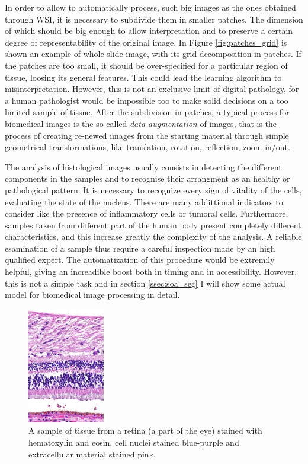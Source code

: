 In order to allow to automatically process, such big images as the ones obtained through WSI, it is necessary to subdivide them in smaller patches. The dimension of which should be big enough to allow interpretation and to preserve a certain degree of representability of the original image. In Figure \ref{fig:patches_grid} is shown an example of whole slide image, with its grid decomposition in patches. If the patches are too small, it should be over-specified for a particular region of tissue, loosing its general features. This could lead the learning algorithm to misinterpretation. However, this is not an exclusive limit of digital pathology, for a human pathologist would be impossible too to make solid decisions on a too limited sample of tissue. After the subdivision in patches, a typical process for biomedical images is the so-called \textit{data augmentation} of images, that is the process of creating re-newed images from the starting material through simple geometrical transformations, like translation, rotation, reflection, zoom in/out.

The analysis of histological images usually consists in detecting the different components in the samples and to recognise their arrangment as an healthy or pathological pattern. It is necessary to recognize every sign of vitality of the cells, evaluating the state of the nucleus. There are many addittional indicators to consider like the presence of inflammatory cells or tumoral cells. Furthermore, samples taken from different part of the human body present completely different characteristics, and this increase greatly the complexity of the analysis.
A reliable esamination of a sample thus require a careful inspection made by an high qualified expert. The automatization of this procedure would be extremily helpful, giving an increadible boost both in timing and in accessibility. However, this is not a simple task and in section \ref{ssec:soa_seg} I will show some actual model for biomedical image processing in detail.

 \begin{figure}
     \centering
     \includegraphics[width = 0.3\textwidth]{images/h&e_retyna}
     \caption{A sample of tissue from a retina (a part of the eye) stained with hematoxylin and eosin, cell nuclei stained blue-purple and extracellular material stained pink.}
     \label{fig:he_retyna}
 \end{figure}

